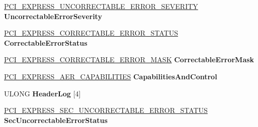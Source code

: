 \begin{DoxyCompactItemize}
\hyperlink{union___p_c_i___e_x_p_r_e_s_s___u_n_c_o_r_r_e_c_t_a_b_l_e___e_r_r_o_r___s_e_v_e_r_i_t_y}{P\+C\+I\+\_\+\+E\+X\+P\+R\+E\+S\+S\+\_\+\+U\+N\+C\+O\+R\+R\+E\+C\+T\+A\+B\+L\+E\+\_\+\+E\+R\+R\+O\+R\+\_\+\+S\+E\+V\+E\+R\+I\+TY} {\bfseries Uncorrectable\+Error\+Severity}
\item 
\mbox{\label{struct___p_c_i___e_x_p_r_e_s_s___a_e_r___c_a_p_a_b_i_l_i_t_y_a26b33de06068038f6d692dbc4713cec9}} 
\hyperlink{union___p_c_i___e_x_p_r_e_s_s___c_o_r_r_e_c_t_a_b_l_e___e_r_r_o_r___s_t_a_t_u_s}{P\+C\+I\+\_\+\+E\+X\+P\+R\+E\+S\+S\+\_\+\+C\+O\+R\+R\+E\+C\+T\+A\+B\+L\+E\+\_\+\+E\+R\+R\+O\+R\+\_\+\+S\+T\+A\+T\+US} {\bfseries Correctable\+Error\+Status}
\item 
\mbox{\label{struct___p_c_i___e_x_p_r_e_s_s___a_e_r___c_a_p_a_b_i_l_i_t_y_a395c5fdd8cac3bf8cb0a0a563059cfec}} 
\hyperlink{union___p_c_i___e_x_p_r_e_s_s___c_o_r_r_e_c_t_a_b_l_e___e_r_r_o_r___m_a_s_k}{P\+C\+I\+\_\+\+E\+X\+P\+R\+E\+S\+S\+\_\+\+C\+O\+R\+R\+E\+C\+T\+A\+B\+L\+E\+\_\+\+E\+R\+R\+O\+R\+\_\+\+M\+A\+SK} {\bfseries Correctable\+Error\+Mask}
\item 
\mbox{\label{struct___p_c_i___e_x_p_r_e_s_s___a_e_r___c_a_p_a_b_i_l_i_t_y_a0dbc66eb47e5f268d12f02ca67cbfb22}} 
\hyperlink{union___p_c_i___e_x_p_r_e_s_s___a_e_r___c_a_p_a_b_i_l_i_t_i_e_s}{P\+C\+I\+\_\+\+E\+X\+P\+R\+E\+S\+S\+\_\+\+A\+E\+R\+\_\+\+C\+A\+P\+A\+B\+I\+L\+I\+T\+I\+ES} {\bfseries Capabilities\+And\+Control}
\item 
\mbox{\label{struct___p_c_i___e_x_p_r_e_s_s___a_e_r___c_a_p_a_b_i_l_i_t_y_a867ae879f175ed64d9ccae6cbc458d02}} 
U\+L\+O\+NG {\bfseries Header\+Log} \mbox{[}4\mbox{]}
\item 
\mbox{\label{struct___p_c_i___e_x_p_r_e_s_s___a_e_r___c_a_p_a_b_i_l_i_t_y_a75942b40930367044abc2e4c5894e852}} 
\hyperlink{union___p_c_i___e_x_p_r_e_s_s___s_e_c___u_n_c_o_r_r_e_c_t_a_b_l_e___e_r_r_o_r___s_t_a_t_u_s}{P\+C\+I\+\_\+\+E\+X\+P\+R\+E\+S\+S\+\_\+\+S\+E\+C\+\_\+\+U\+N\+C\+O\+R\+R\+E\+C\+T\+A\+B\+L\+E\+\_\+\+E\+R\+R\+O\+R\+\_\+\+S\+T\+A\+T\+US} {\bfseries Sec\+Uncorrectable\+Error\+Status}

\end{DoxyCompactItemize}
